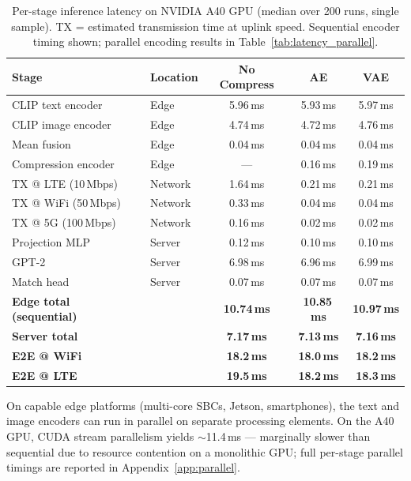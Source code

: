 \begin{table}[h]
\centering
\caption{Per-stage inference latency on NVIDIA A40 GPU (median over 200 runs, single sample). TX = estimated transmission time at uplink speed. Sequential encoder timing shown; parallel encoding results in Table~\ref{tab:latency_parallel}.}
\label{tab:latency}
\begin{tabular}{llccc}
\toprule
\textbf{Stage} & \textbf{Location} & \textbf{No Compress} & \textbf{AE} & \textbf{VAE} \\
\midrule
CLIP text encoder   & Edge    & 5.96\,ms & 5.93\,ms & 5.97\,ms \\
CLIP image encoder  & Edge    & 4.74\,ms & 4.72\,ms & 4.76\,ms \\
Mean fusion         & Edge    & 0.04\,ms & 0.04\,ms & 0.04\,ms \\
Compression encoder & Edge    & —        & 0.16\,ms & 0.19\,ms \\
\midrule
TX @ LTE (10\,Mbps) & Network & 1.64\,ms & 0.21\,ms & 0.21\,ms \\
TX @ WiFi (50\,Mbps)& Network & 0.33\,ms & 0.04\,ms & 0.04\,ms \\
TX @ 5G (100\,Mbps) & Network & 0.16\,ms & 0.02\,ms & 0.02\,ms \\
\midrule
Projection MLP      & Server  & 0.12\,ms & 0.10\,ms & 0.10\,ms \\
GPT-2               & Server  & 6.98\,ms & 6.96\,ms & 6.99\,ms \\
Match head          & Server  & 0.07\,ms & 0.07\,ms & 0.07\,ms \\
\midrule
\textbf{Edge total (sequential)} & & \textbf{10.74\,ms} & \textbf{10.85\,ms} & \textbf{10.97\,ms} \\
\textbf{Server total}            & & \textbf{7.17\,ms}  & \textbf{7.13\,ms}  & \textbf{7.16\,ms}  \\
\textbf{E2E @ WiFi}              & & \textbf{18.2\,ms}  & \textbf{18.0\,ms}  & \textbf{18.2\,ms}  \\
\textbf{E2E @ LTE}               & & \textbf{19.5\,ms}  & \textbf{18.2\,ms}  & \textbf{18.3\,ms}  \\
\bottomrule
\end{tabular}
\end{table}

On capable edge platforms (multi-core SBCs, Jetson, smartphones), the text and image encoders can run in parallel on separate processing elements. On the A40 GPU, CUDA stream parallelism yields $\sim$11.4\,ms — marginally slower than sequential due to resource contention on a monolithic GPU; full per-stage parallel timings are reported in Appendix~\ref{app:parallel}.

